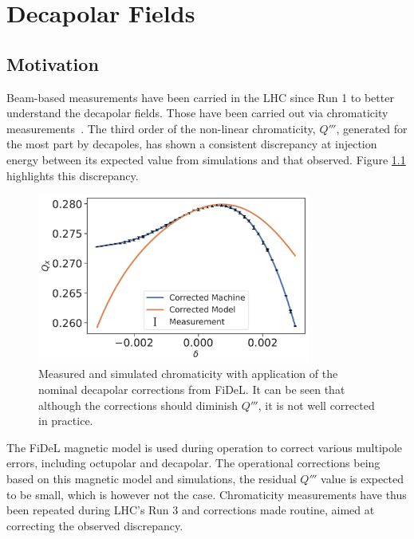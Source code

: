 \chapter{Decapolar Fields}
\thumbforchapter{}
\chaptertoc{}
\newpage

\section{Motivation}

Beam-based measurements have been carried in the LHC since Run 1 to better understand the decapolar
fields. Those have been carried out via chromaticity
measurements~\cite{maclean_non-linear_2011,maclean_commissioning_2016,maclean_measurement_2014}. 
The third order of the non-linear chromaticity, $Q'''$, generated for the most part by decapoles,
has shown a consistent discrepancy at injection energy between its expected value from simulations
and that observed. Figure \ref{fig:decapoles:bare_chroma_vs_simulations} highlights this
discrepancy.

\begin{figure}[H]
    \centering
    \includegraphics[width=0.8\textwidth]{images/dq3_corrected_simulation_fidel.pdf}
    \caption{Measured and simulated chromaticity with application of the nominal decapolar
    corrections from FiDeL. It can be seen that although the corrections should diminish $Q'''$, it
    is not well corrected in practice.}
    \label{fig:decapoles:bare_chroma_vs_simulations}
\end{figure}

The FiDeL magnetic model is used during operation to correct various multipole errors, including
octupolar and decapolar. The operational corrections being based on this magnetic model and
simulations, the residual $Q'''$ value is expected to be small, which is however not the case.
Chromaticity measurements have thus been repeated during LHC's Run 3 and corrections made routine,
aimed at correcting the observed discrepancy.

